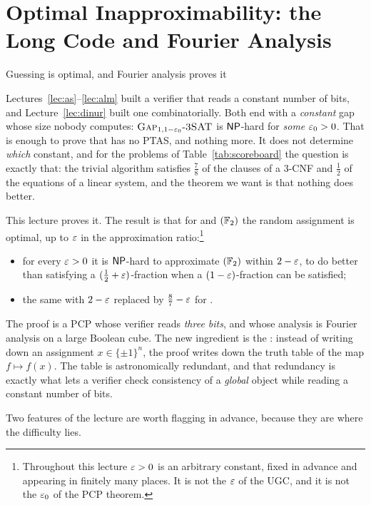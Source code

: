 \chapter{Optimal Inapproximability: the Long Code and Fourier Analysis}
\label{lec:hastad}

{\sffamily\large\color{softgray}Guessing is optimal, and Fourier analysis proves it\par}
\vspace{0.5em}

\noindent
Lectures~\ref{lec:as}--\ref{lec:alm} built a verifier that reads a constant number of bits, and Lecture~\ref{lec:dinur} built one combinatorially.  Both end with a \emph{constant} gap whose size nobody computes: $\textsc{Gap}_{1,1-\varepsilon_0}\text{-}\textsc{3SAT}$ is $\mathsf{NP}$-hard for \emph{some} $\varepsilon_0>0$.  That is enough to prove that  has no PTAS, and nothing more.  It does not determine \emph{which} constant,
and for the problems of Table~\ref{tab:scoreboard} the question is exactly that: the trivial algorithm satisfies $\tfrac78$ of the clauses of a $3$-CNF and $\tfrac12$ of the equations of a linear system,
and the theorem we want is that nothing does better.

This lecture proves it.  The result is that for  and $(\mathbb{F}_2)$ the random assignment is optimal, up to $\varepsilon$ in the approximation ratio:\footnote{Throughout this lecture $\varepsilon>0$ is an arbitrary constant, fixed in advance and appearing in finitely many places.  It is not the $\varepsilon$ of the UGC, and it is not the $\varepsilon_0$ of the PCP theorem.}
\begin{itemize}
  \item for every $\varepsilon>0$ it is $\mathsf{NP}$-hard to approximate $(\mathbb{F}_2)$ within $2-\varepsilon$, \ie to do better than satisfying a $(\tfrac12+\varepsilon)$-fraction when a $(1-\varepsilon)$-fraction can be satisfied;
  \item the same with $2-\varepsilon$ replaced by $\tfrac87-\varepsilon$ for .
\end{itemize}
The proof is a PCP whose verifier reads \emph{three bits}, and whose analysis is Fourier analysis on a large Boolean cube.  The new ingredient is the : instead of writing down an assignment $x\in\{\pm1\}^n$, the proof writes down the truth table of the map $f\mapsto f(x)$.
The table is astronomically redundant, and that redundancy is exactly what lets a verifier check consistency of a \emph{global} object while reading a constant number of bits.

Two features of the lecture are worth flagging in advance, because they are where the difficulty lies.

